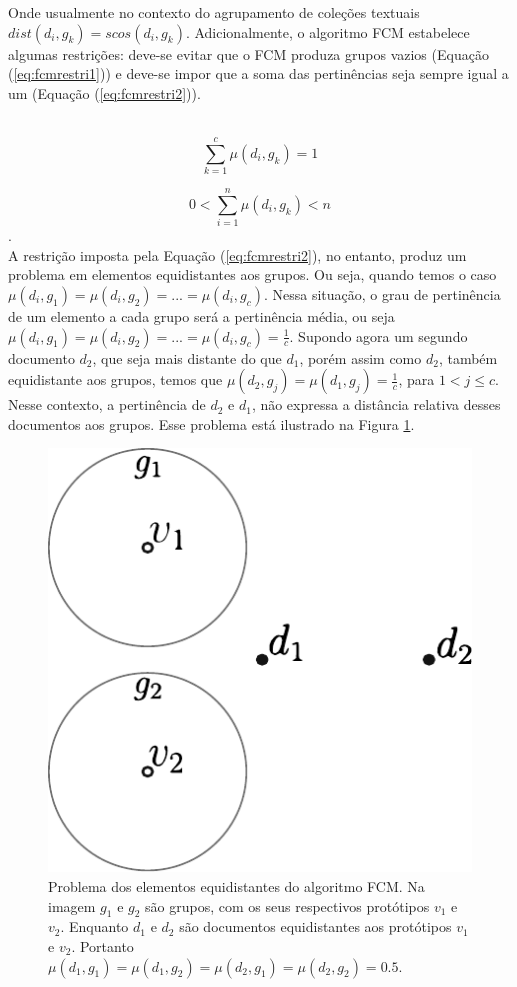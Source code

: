 Onde usualmente no contexto do agrupamento de coleções textuais $dist(d_i,g_k) = scos(d_i,g_k)$.
Adicionalmente, o algoritmo FCM estabelece algumas restrições: deve-se evitar que o FCM produza
grupos vazios (Equação (\ref{eq:fcmrestri1})) e deve-se impor que a soma das pertinências seja
sempre igual a um (Equação (\ref{eq:fcmrestri2})).

\leavevmode\\
\begin{equation} \sum_{k=1}^c
  \mu(d_i,g_k) = 1 \label{eq:fcmrestri1} 
\end{equation}

\begin{equation} 0 < \sum_{i=1}^n
  \mu(d_i,g_k) < n \label{eq:fcmrestri2} 
\end{equation}. 
\leavevmode\\

A restrição imposta pela Equação (\ref{eq:fcmrestri2}), no entanto, produz um problema em elementos
equidistantes aos grupos. Ou seja, quando temos o caso $\mu(d_i, g_1) = \mu(d_i, g_2) = ... =
\mu(d_i, g_c)$. Nessa situação, o grau de pertinência de um elemento a cada grupo será a pertinência
média, ou seja $\mu(d_i, g_1) = \mu(d_i, g_2) = ... = \mu(d_i, g_c) = \frac{1}{c}$. Supondo agora um
segundo documento $d_2$, que seja mais distante do que $d_1$, porém assim como $d_2$, também
equidistante aos grupos, temos que $\mu(d_2, g_j) = \mu(d_1, g_j) = \frac{1}{c}$, para $1 < j \leq
c$. Nesse contexto, a pertinência de $d_2$ e $d_1$, não expressa a distância relativa desses
documentos aos grupos. Esse problema está ilustrado na Figura \ref{fig:fcm_problem}.

\begin{figure}[!htp] \centering
  \includegraphics[width=0.4\columnwidth]{assets/fcm_problem.pdf} 
  \caption{Problema dos
    elementos equidistantes do algoritmo FCM. Na imagem $g_1$ e $g_2$ são grupos, com os seus
    respectivos protótipos $v_1$ e $v_2$. Enquanto $d_1$ e $d_2$ são documentos equidistantes aos
    protótipos $v_1$ e $v_2$. Portanto $\mu(d_1,g_1) = \mu(d_1,g_2) = \mu(d_2,g_1) = \mu(d_2,g_2) =
0.5$.} 
  \label{fig:fcm_problem} 
\end{figure}

